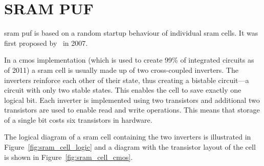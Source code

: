 \chapter{SRAM PUF}

\gls{sram} \gls{puf} is based on a random startup behaviour of individual \gls{sram} cells. It was first proposed by~\cite{Guajardo2007} in 2007.

In a \gls{cmos} implementation (which is used to create 99\% of integrated circuits as of 2011\cite{Voinigescu2013}) a \gls{sram} cell is usually made up of two cross-coupled inverters. The inverters reinforce each other of their state, thus creating a bistable circuit---a circuit with only two stable states. This enables the cell to save exactly one logical bit. Each inverter is implemented using two transistors and additional two transistors are used to enable read and write operations. This means that storage of a single bit costs six transistors in hardware.\cite{Maes2010}

The logical diagram of a \gls{sram} cell containing the two inverters is illustrated in Figure~\ref{fig:sram_cell_logic} and a diagram with the transistor layout of the cell is shown in Figure~\ref{fig:sram_cell_cmos}.


